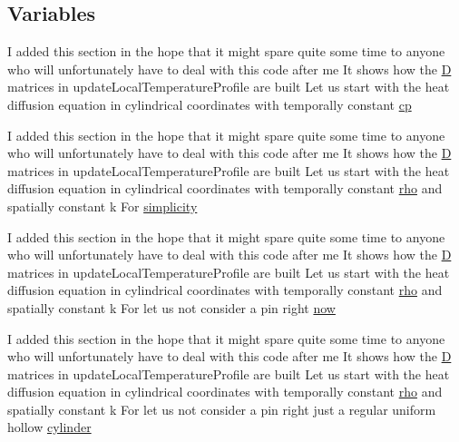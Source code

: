 \subsection*{Variables}
\begin{DoxyCompactItemize}
\item 
I added this section in the hope that it might spare quite some time to anyone who will unfortunately have to deal with this code after me It shows how the \hyperlink{setXSFieldsSN_8H_a70ac93a527a85b4edf386830643d1561}{D} matrices in update\+Local\+Temperature\+Profile are built Let us start with the heat diffusion equation in cylindrical coordinates with temporally constant \hyperlink{nuclearFuelPinTest_8C_ae5fc70d73cd9d6fbeb7bf5456b34ef16}{cp}
\item 
I added this section in the hope that it might spare quite some time to anyone who will unfortunately have to deal with this code after me It shows how the \hyperlink{setXSFieldsSN_8H_a70ac93a527a85b4edf386830643d1561}{D} matrices in update\+Local\+Temperature\+Profile are built Let us start with the heat diffusion equation in cylindrical coordinates with temporally constant \hyperlink{EEqn__1pl_8H_ac955f87ac2b79f02f420cae087fc52b1}{rho} and spatially constant k For \hyperlink{nuclearFuelPinTest_8C_ab5364626cf5774043302fd6c7196a05f}{simplicity}
\item 
I added this section in the hope that it might spare quite some time to anyone who will unfortunately have to deal with this code after me It shows how the \hyperlink{setXSFieldsSN_8H_a70ac93a527a85b4edf386830643d1561}{D} matrices in update\+Local\+Temperature\+Profile are built Let us start with the heat diffusion equation in cylindrical coordinates with temporally constant \hyperlink{EEqn__1pl_8H_ac955f87ac2b79f02f420cae087fc52b1}{rho} and spatially constant k For let us not consider a pin right \hyperlink{nuclearFuelPinTest_8C_a09404a3c5e8ea04b3e44ae4cb130f396}{now}
\item 
I added this section in the hope that it might spare quite some time to anyone who will unfortunately have to deal with this code after me It shows how the \hyperlink{setXSFieldsSN_8H_a70ac93a527a85b4edf386830643d1561}{D} matrices in update\+Local\+Temperature\+Profile are built Let us start with the heat diffusion equation in cylindrical coordinates with temporally constant \hyperlink{EEqn__1pl_8H_ac955f87ac2b79f02f420cae087fc52b1}{rho} and spatially constant k For let us not consider a pin right just a regular uniform hollow \hyperlink{nuclearFuelPinTest_8C_aa5e8becd7f504abaf6e34b6dcd491e94}{cylinder}
\end{DoxyCompactItemize}


